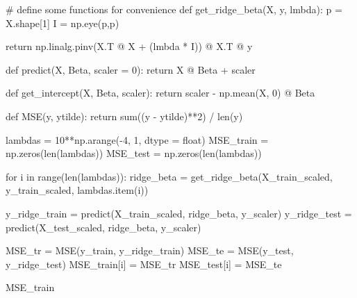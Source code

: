 \documentclass[
  letterpaper,
  DIV=11,
  numbers=noendperiod]{scrartcl}
\newenvironment{Shaded}{\begin{snugshade}}{\end{snugshade}}
\newcommand{\BuiltInTok}[1]{\textcolor[rgb]{0.00,0.23,0.31}{#1}}
\newcommand{\CommentTok}[1]{\textcolor[rgb]{0.37,0.37,0.37}{#1}}
\newcommand{\ControlFlowTok}[1]{\textcolor[rgb]{0.00,0.23,0.31}{#1}}
\newcommand{\DecValTok}[1]{\textcolor[rgb]{0.68,0.00,0.00}{#1}}
\newcommand{\KeywordTok}[1]{\textcolor[rgb]{0.00,0.23,0.31}{#1}}
\newcommand{\NormalTok}[1]{\textcolor[rgb]{0.00,0.23,0.31}{#1}}
\newcommand{\OperatorTok}[1]{\textcolor[rgb]{0.37,0.37,0.37}{#1}}
\begin{document}
\begin{Shaded}
\begin{Highlighting}[]
\CommentTok{\# define some functions for convenience}
\KeywordTok{def}\NormalTok{ get\_ridge\_beta(X, y, lmbda):}
\NormalTok{    p }\OperatorTok{=}\NormalTok{ X.shape[}\DecValTok{1}\NormalTok{]}
\NormalTok{    I }\OperatorTok{=}\NormalTok{ np.eye(p,p)}
    
    \ControlFlowTok{return}\NormalTok{ np.linalg.pinv(X.T }\OperatorTok{@}\NormalTok{ X }\OperatorTok{+}\NormalTok{ (lmbda }\OperatorTok{*}\NormalTok{ I)) }\OperatorTok{@}\NormalTok{ X.T }\OperatorTok{@}\NormalTok{ y}

\KeywordTok{def}\NormalTok{ predict(X, Beta, scaler }\OperatorTok{=} \DecValTok{0}\NormalTok{):}
    \ControlFlowTok{return}\NormalTok{ X }\OperatorTok{@}\NormalTok{ Beta }\OperatorTok{+}\NormalTok{ scaler}

\KeywordTok{def}\NormalTok{ get\_intercept(X, Beta, scaler):}
    \ControlFlowTok{return}\NormalTok{ scaler }\OperatorTok{{-}}\NormalTok{ np.mean(X, }\DecValTok{0}\NormalTok{) }\OperatorTok{@}\NormalTok{ Beta}

\KeywordTok{def}\NormalTok{ MSE(y, ytilde):}
    \ControlFlowTok{return} \BuiltInTok{sum}\NormalTok{((y }\OperatorTok{{-}}\NormalTok{ ytilde)}\OperatorTok{**}\DecValTok{2}\NormalTok{) }\OperatorTok{/} \BuiltInTok{len}\NormalTok{(y)}
\end{Highlighting}
\end{Shaded}

\begin{Shaded}
\begin{Highlighting}[]
\NormalTok{lambdas }\OperatorTok{=} \DecValTok{10}\OperatorTok{**}\NormalTok{np.arange(}\OperatorTok{{-}}\DecValTok{4}\NormalTok{, }\DecValTok{1}\NormalTok{, dtype }\OperatorTok{=} \BuiltInTok{float}\NormalTok{)}
\NormalTok{MSE\_train }\OperatorTok{=}\NormalTok{ np.zeros(}\BuiltInTok{len}\NormalTok{(lambdas))}
\NormalTok{MSE\_test }\OperatorTok{=}\NormalTok{ np.zeros(}\BuiltInTok{len}\NormalTok{(lambdas))}

\ControlFlowTok{for}\NormalTok{ i }\KeywordTok{in} \BuiltInTok{range}\NormalTok{(}\BuiltInTok{len}\NormalTok{(lambdas)):}
\NormalTok{    ridge\_beta }\OperatorTok{=}\NormalTok{ get\_ridge\_beta(X\_train\_scaled, y\_train\_scaled, }
\NormalTok{                                lambdas.item(i))}
    
\NormalTok{    y\_ridge\_train }\OperatorTok{=}\NormalTok{ predict(X\_train\_scaled, ridge\_beta, y\_scaler)}
\NormalTok{    y\_ridge\_test }\OperatorTok{=}\NormalTok{ predict(X\_test\_scaled, ridge\_beta, y\_scaler)}
    
\NormalTok{    MSE\_tr }\OperatorTok{=}\NormalTok{ MSE(y\_train, y\_ridge\_train)}
\NormalTok{    MSE\_te }\OperatorTok{=}\NormalTok{ MSE(y\_test, y\_ridge\_test)}
\NormalTok{    MSE\_train[i] }\OperatorTok{=}\NormalTok{ MSE\_tr}
\NormalTok{    MSE\_test[i] }\OperatorTok{=}\NormalTok{ MSE\_te}

\NormalTok{MSE\_train}
\end{Highlighting}
\end{Shaded}
\end{document}
